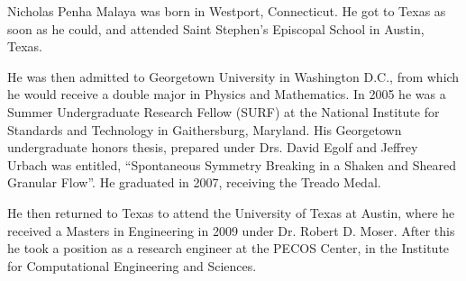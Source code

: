 

Nicholas Penha Malaya was born in Westport, Connecticut. He got to Texas
as soon as he could, and attended Saint Stephen's Episcopal School in
Austin, Texas. 

He was then admitted to Georgetown University in Washington D.C., from
which he would receive a double major in Physics and Mathematics. In
2005 he was a Summer Undergraduate Research Fellow (SURF) at the
National Institute for Standards and Technology in Gaithersburg,
Maryland. His Georgetown undergraduate honors thesis, prepared under
Drs\@. David Egolf and Jeffrey Urbach was entitled, ``Spontaneous
Symmetry Breaking in a Shaken and Sheared Granular Flow''. He graduated
in 2007, receiving the Treado Medal.   

He then returned to Texas to attend the University of Texas at
Austin, where he received a Masters in Engineering in 2009 under
Dr\@. Robert D. Moser. After this he took a position as a research
engineer at the PECOS Center, in the Institute for Computational
Engineering and Sciences. 

